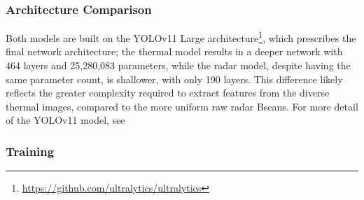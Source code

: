 \subsubsection{Architecture Comparison}

Both models are built on the YOLOv11 Large architecture\footnote{\url{https://github.com/ultralytics/ultralytics}}, which prescribes the final network architecture; the thermal model results in a deeper network with 464 layers and 25,280,083 parameters, while the radar model, despite having the same parameter count, is shallower, with only 190 layers. This difference likely reflects the greater complexity required to extract features from the diverse thermal images, compared to the more uniform raw radar Bscans. For more detail of the YOLOv11 model, see \cite{khanam2024yolov11}

\subsubsection{Training}


